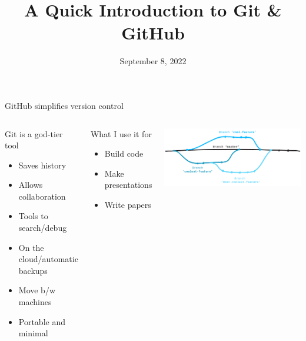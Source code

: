 \documentclass[aspectratio=169]{beamer}
\title{A Quick Introduction to Git \& GitHub}
\institute{University of South Florida}
\date{September 8, 2022}
\begin{document}
\begin{frame}[plain]
  \titlepage
\end{frame}

\begin{frame}[c]{GitHub simplifies version control}


  \begin{columns}[T]


    \centering
    \begin{block}{Git is a god-tier tool}
      \begin{itemize} 
      \item Saves history
      \item Allows collaboration
      \item Tools to search/debug
      \item On the cloud/automatic backups
      \item Move b/w machines
      \item Portable and minimal
    \end{itemize}
    \end{block}

    \begin{block}{What I use it for}
      \begin{itemize} 
      \item Build code
      \item Make presentations
      \item Write papers
    \end{itemize}
    \end{block}


    \centering
    \vspace{\baselineskip}
    \includegraphics[width=\textwidth]{figs/fig-git_branches.png}


\end{columns}
\end{frame}
\end{document}
